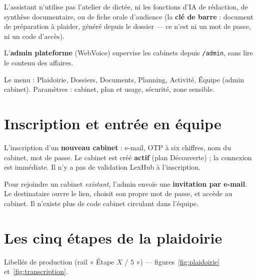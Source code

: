 L'assistant n'utilise pas l'atelier de dictée, ni les fonctions d'IA de rédaction, de synthèse documentaire, ou de fiche orale d'audience (la \textbf{clé de barre} : document de préparation à plaider, généré depuis le dossier --- ce n'est ni un mot de passe, ni un code d'accès).

L'\textbf{admin plateforme} (WebVoice) supervise les cabinets depuis \texttt{/admin}, sans lire le contenu des affaires.

Le menu : Plaidoirie, Dossiers, Documents, Planning, Activité, Équipe (admin cabinet). Paramètres : cabinet, plan et usage, sécurité, zone sensible.

\section{Inscription et entrée en équipe}

L'inscription d'un \textbf{nouveau cabinet} : e-mail, OTP à six chiffres, nom du cabinet, mot de passe. Le cabinet est créé \textbf{actif} (plan Découverte) ; la connexion est immédiate. Il n'y a pas de validation LexHub à l'inscription.

Pour rejoindre un cabinet \emph{existant}, l'admin envoie une \textbf{invitation par e-mail}. Le destinataire ouvre le lien, choisit son propre mot de passe, et accède au cabinet. Il n'existe plus de code cabinet circulant dans l'équipe.

\section{Les cinq étapes de la plaidoirie}
\label{sec:guide}

Libellés de production (rail « Étape $X$ / $5$ ») --- figures~\ref{fig:plaidoirie} et~\ref{fig:transcription}.


